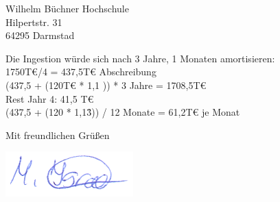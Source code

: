 \documentclass[
    version=last,           %
    DIV=13,                 %
    BCOR=0mm,               %
    paper=a4,               %
    fontsize=12pt,          %
    firsthead=on,           %
    firstfoot=on,           %
    pagenumber=on,i         %
    parskip=half,           %
    enlargefirstpage=,      %
    firsthead=on,           %
    fromrule=afteraddress,  %
    priority=off,           %
    backaddress=true,       %
    refline=dateright,      %
	fromalign=right,	    %
    fromemail=on,i          %
    fromurl=on,             %
    frombank=on,
    fromphone=on,           %
    frommobilephone=on      %
    fromlogo=on,            %
    addrfield=on,           %
    subject=untitled,  %
    foldmarks=off,          %
    numericaldate=off,      %
	pagenumber=right,	        %
	parskip=half,	        %
    headsep=false,          %
    footsepline=true,       %
    foldmarks=off,		    %
	]{scrlttr2}
\begin{document}
\begin{letter} {Wilhelm Büchner Hochschule \\
Hilpertstr. 31\\
64295 Darmstad}
\begin{enumerate}
    Die Ingestion würde sich nach 3 Jahre, 1 Monaten amortisieren: \\

    1750T€/4 = 437,5T€ Abschreibung \\
    (437,5 + (120T€ * 1,1 )) * 3 Jahre = 1708,5T€ \\
    Rest Jahr 4: 41,5 T€ \\
    (437,5 + (120 * 1,1\^3)) / 12 Monate = 61,2T€ je Monat
\end{enumerate}

\closing{Mit freundlichen Grüßen}
    \includegraphics[scale=0.70]{../unterschrift.png}




%





\end{letter}
\end{document}
